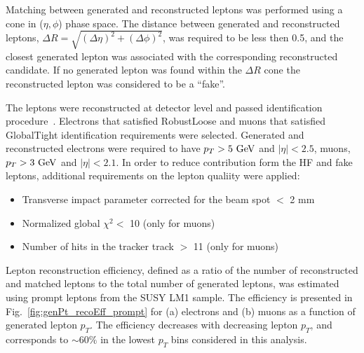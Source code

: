 \documentclass{cmspaper}
\begin{document}
Matching between generated and reconstructed leptons was performed using a
cone in ($\eta, \phi$) phase space. The distance between generated and reconstructed leptons,
$\Delta R = \sqrt{(\Delta \eta)^2 + (\Delta \phi)^2}$, was required to be less then 0.5, and the
closest generated lepton was associated with the corresponding reconstructed candidate. If no
generated lepton was found within the $\Delta R$ cone the reconstructed lepton was considered to be
a ``fake''.

The leptons were reconstructed at detector level and passed identification
procedure~\cite{elecid,muonid}. Electrons that satisfied RobustLoose and muons that satisfied
GlobalTight identification requirements were selected. Generated and reconstructed electrons were
required to have $p_T > 5~{\rm GeV}$ and $|\eta| < 2.5$, muons, $p_T > 3~{\rm GeV}$ and
$|\eta| < 2.1$. In order to reduce contribution form the HF and fake leptons, additional requirements on the lepton qualiity were applied:
\begin{itemize}
\item Transverse impact parameter corrected for the beam spot $<$ 2 mm
\item Normalized global $\chi^2 <$ 10 (only for muons)
\item Number of hits in the tracker track $>$ 11 (only for muons)
\end{itemize}

Lepton reconstruction efficiency, defined as a ratio of the number of reconstructed and matched
leptons to the total number of generated leptons, was estimated using prompt leptons from the SUSY
LM1 sample. The efficiency is presented in Fig.~\ref{fig:genPt_recoEff_prompt} for (a) electrons and
(b) muons as a function of generated lepton $p_T$. The efficiency decreases with
decreasing lepton $p_T$, and corresponds to $\sim 60\%$ in the lowest $p_T$ bins considered in this
analysis.
\end{document}

